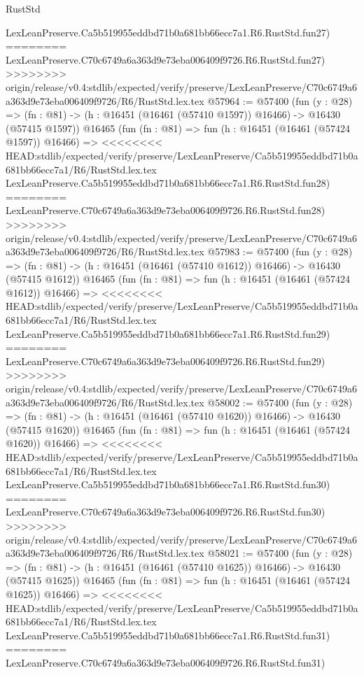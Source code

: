 \begin{lexlean}{RustStd}
\begin{coremodule}
{\begin{coremodule}
{{{{{{{{{{{{{{{{{{{{{{{{{{{{{{{{{{{{{{{{{{{{{{{{{{{{{{{    LexLeanPreserve.Ca5b519955eddbd71b0a681bb66ecc7a1.R6.RustStd.fun27)
========
    LexLeanPreserve.C70c6749a6a363d9e73eba006409f9726.R6.RustStd.fun27)
>>>>>>>> origin/release/v0.4:stdlib/expected/verify/preserve/LexLeanPreserve/C70c6749a6a363d9e73eba006409f9726/R6/RustStd.lex.tex
@57964 := @57400
    (fun (y : @28) =>
    (fn : @81) -> (h : @16451 (@16461 (@57410 @1597)) @16466) -> @16430 (@57415 @1597))
    @16465
    (fun (fn : @81) =>
    fun (h : @16451 (@16461 (@57424 @1597)) @16466) =>
<<<<<<<< HEAD:stdlib/expected/verify/preserve/LexLeanPreserve/Ca5b519955eddbd71b0a681bb66ecc7a1/R6/RustStd.lex.tex
    LexLeanPreserve.Ca5b519955eddbd71b0a681bb66ecc7a1.R6.RustStd.fun28)
========
    LexLeanPreserve.C70c6749a6a363d9e73eba006409f9726.R6.RustStd.fun28)
>>>>>>>> origin/release/v0.4:stdlib/expected/verify/preserve/LexLeanPreserve/C70c6749a6a363d9e73eba006409f9726/R6/RustStd.lex.tex
@57983 := @57400
    (fun (y : @28) =>
    (fn : @81) -> (h : @16451 (@16461 (@57410 @1612)) @16466) -> @16430 (@57415 @1612))
    @16465
    (fun (fn : @81) =>
    fun (h : @16451 (@16461 (@57424 @1612)) @16466) =>
<<<<<<<< HEAD:stdlib/expected/verify/preserve/LexLeanPreserve/Ca5b519955eddbd71b0a681bb66ecc7a1/R6/RustStd.lex.tex
    LexLeanPreserve.Ca5b519955eddbd71b0a681bb66ecc7a1.R6.RustStd.fun29)
========
    LexLeanPreserve.C70c6749a6a363d9e73eba006409f9726.R6.RustStd.fun29)
>>>>>>>> origin/release/v0.4:stdlib/expected/verify/preserve/LexLeanPreserve/C70c6749a6a363d9e73eba006409f9726/R6/RustStd.lex.tex
@58002 := @57400
    (fun (y : @28) =>
    (fn : @81) -> (h : @16451 (@16461 (@57410 @1620)) @16466) -> @16430 (@57415 @1620))
    @16465
    (fun (fn : @81) =>
    fun (h : @16451 (@16461 (@57424 @1620)) @16466) =>
<<<<<<<< HEAD:stdlib/expected/verify/preserve/LexLeanPreserve/Ca5b519955eddbd71b0a681bb66ecc7a1/R6/RustStd.lex.tex
    LexLeanPreserve.Ca5b519955eddbd71b0a681bb66ecc7a1.R6.RustStd.fun30)
========
    LexLeanPreserve.C70c6749a6a363d9e73eba006409f9726.R6.RustStd.fun30)
>>>>>>>> origin/release/v0.4:stdlib/expected/verify/preserve/LexLeanPreserve/C70c6749a6a363d9e73eba006409f9726/R6/RustStd.lex.tex
@58021 := @57400
    (fun (y : @28) =>
    (fn : @81) -> (h : @16451 (@16461 (@57410 @1625)) @16466) -> @16430 (@57415 @1625))
    @16465
    (fun (fn : @81) =>
    fun (h : @16451 (@16461 (@57424 @1625)) @16466) =>
<<<<<<<< HEAD:stdlib/expected/verify/preserve/LexLeanPreserve/Ca5b519955eddbd71b0a681bb66ecc7a1/R6/RustStd.lex.tex
    LexLeanPreserve.Ca5b519955eddbd71b0a681bb66ecc7a1.R6.RustStd.fun31)
========
    LexLeanPreserve.C70c6749a6a363d9e73eba006409f9726.R6.RustStd.fun31)
}}}}}}}}}}}}}}}}}}}}}}}}}}}}}}}}}}}}}}}}}}}}}}}}}}}}}}}
\end{coremodule}}
\end{coremodule}
\end{lexlean}

